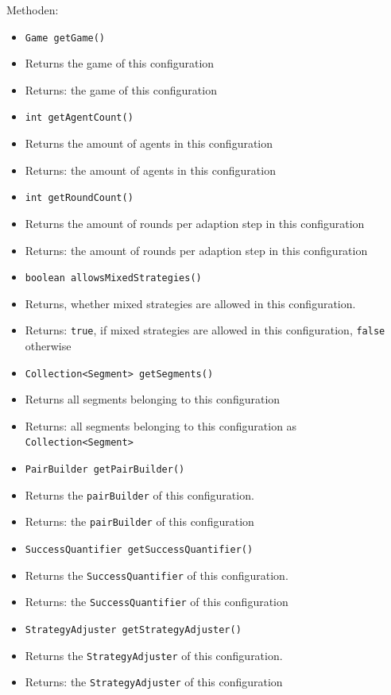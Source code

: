 \documentclass[parskip=full,11pt]{scrartcl}
\begin{document}
Methoden:
\begin{itemize}\itemsep -10pt
\item \texttt{Game getGame()}
\item[] Returns the game of this configuration
\item[] Returns: the game of this configuration

\item \texttt{int getAgentCount()}
\item[] Returns the amount of agents in this configuration
\item[] Returns: the amount of agents in this configuration

\item \texttt{int getRoundCount()}
\item[] Returns the amount of rounds per adaption step in this configuration
\item[] Returns: the amount of rounds per adaption step in this configuration

\item \texttt{boolean allowsMixedStrategies()}
\item[] Returns, whether mixed strategies are allowed in this configuration.
\item[] Returns: \texttt{true}, if mixed strategies are allowed in this configuration, \texttt{false} otherwise

\item \texttt{Collection<Segment> getSegments()}
\item[] Returns all segments belonging to this configuration
\item[] Returns: all segments belonging to this configuration as \texttt{Collection<Segment>}

\item \texttt{PairBuilder getPairBuilder()}
\item[] Returns the \texttt{pairBuilder} of this configuration.
\item[] Returns: the \texttt{pairBuilder} of this configuration

\item \texttt{SuccessQuantifier getSuccessQuantifier()}
\item[] Returns the \texttt{SuccessQuantifier} of this configuration.
\item[] Returns: the \texttt{SuccessQuantifier} of this configuration

\item \texttt{StrategyAdjuster getStrategyAdjuster()}
\item[] Returns the \texttt{StrategyAdjuster} of this configuration.
\item[] Returns: the \texttt{StrategyAdjuster} of this configuration


\end{itemize}
\end{document}
